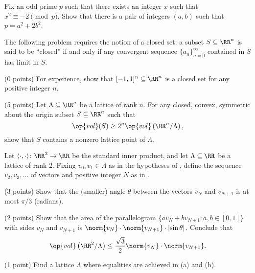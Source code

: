 \documentclass[../notes.tex]{subfiles}
\begin{document}
\begin{prob}[4 points]
	Fix an odd prime $p$ such that there exists an integer $x$ such that $x^2\equiv-2\pmod p$. Show that there is a pair of integers $(a,b)$ such that $p=a^2+2b^2$.
\end{prob}
\begin{prob}[6 points]
	The following problem requires the notion of a closed set: a subset $S\subseteq\RR^n$ is said to be ``closed'' if and only if any convergent sequence $\{a_n\}_{n=0}^\infty$ contained in $S$ has limit in $S$.
	\begin{listalph}
		\item (0 points) For experience, show that $[-1,1]^n\subseteq\RR^n$ is a closed set for any positive integer $n$.
		\item (5 points) Let $\Lambda\subseteq\RR^n$ be a lattice of rank $n$. For any closed, convex, symmetric about the origin subset $S\subseteq\RR^n$ such that
		\[\op{vol}(S)\ge2^n\op{vol}\left(\RR^n/\Lambda\right),\]
		show that $S$ contains a nonzero lattice point of $\Lambda$.
	\end{listalph}
\end{prob}
\begin{prob}[6 points]
	Let $\langle\cdot,\cdot\rangle\colon\RR^2\to\RR$ be the standard inner product, and let $\Lambda\subseteq\RR$ be a lattice of rank $2$. Fixing $v_0,v_1\in\Lambda$ as in the hypotheses of , define the sequence $v_2,v_3,\ldots$ of vectors and positive integer $N$ as in .
	\begin{listalph}
		\item (3 points) Show that the (smaller) angle $\theta$ between the vectors $v_N$ and $v_{N+1}$ is at most $\pi/3$ (radians).
		\item (2 points) Show that the area of the parallelogram $\{av_N+bv_{N+1}:a,b\in[0,1]\}$ with sides $v_N$ and $v_{N+1}$ is $\norm{v_N}\cdot\norm{v_{N+1}}\cdot\left|\sin\theta\right|$. Conclude that
		\[\op{vol}\left(\RR^2/\Lambda\right)\le\frac{\sqrt3}2\norm{v_N}\cdot\norm{v_{N+1}}.\]
		\item (1 point) Find a lattice $\Lambda$ where equalities are achieved in (a) and (b).
	\end{listalph}
\end{prob}
\end{document}
